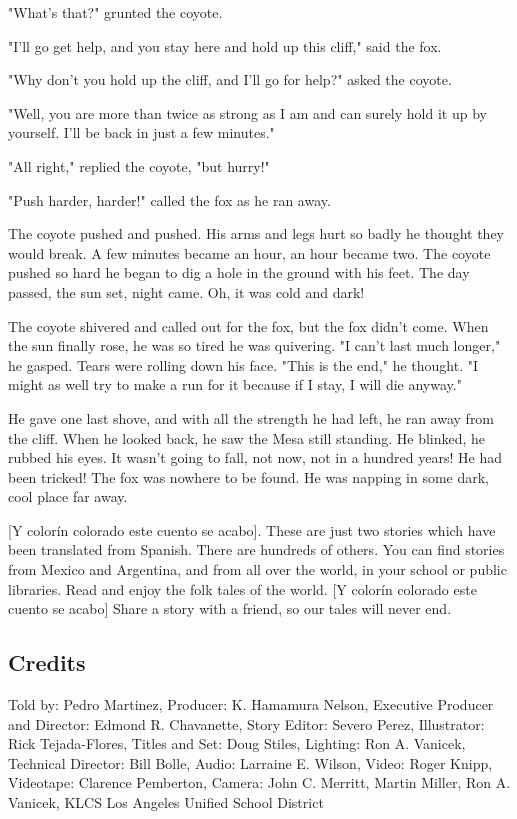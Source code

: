 "What's that?" grunted the coyote.

"I'll go get help, and you stay here and hold up this cliff," said the fox.

"Why don't you hold up the cliff, and I'll go for help?" asked the coyote.

"Well, you are more than twice as strong as I am and can surely hold it up by yourself. I'll be back in just a few minutes."

"All right," replied the coyote, "but hurry!"

"Push harder, harder!" called the fox as he ran away.

The coyote pushed and pushed. His arms and legs hurt so badly he thought they would break. A few minutes became an hour, an hour became two. The coyote pushed so hard he began to dig a hole in the ground with his feet. The day passed, the sun set, night came. Oh, it was cold and dark!

The coyote shivered and called out for the fox, but the fox didn't come. When the sun finally rose, he was so tired he was quivering. "I can't last much longer," he gasped. Tears were rolling down his face. "This is the end," he thought. "I might as well try to make a run for it because if I stay, I will die anyway."

He gave one last shove, and with all the strength he had left, he ran away from the cliff. When he looked back, he saw the Mesa still standing. He blinked, he rubbed his eyes. It wasn't going to fall, not now, not in a hundred years! He had been tricked! The fox was nowhere to be found. He was napping in some dark, cool place far away.

    [Y colorín colorado este cuento se acabo]. These are just two stories which have been translated from Spanish. There are hundreds of others. You can find stories from Mexico and Argentina, and from all over the world, in your school or public libraries. Read and enjoy the folk tales of the world. [Y colorín colorado este cuento se acabo] Share a story with a friend, so our tales will never end.

\subsection{Credits}

Told by: Pedro Martinez,
Producer: K. Hamamura Nelson,
Executive Producer and Director: Edmond R. Chavanette,
Story Editor: Severo Perez,
Illustrator: Rick Tejada-Flores,
Titles and Set: Doug Stiles,
Lighting: Ron A. Vanicek,
Technical Director: Bill Bolle,
Audio: Larraine E. Wilson,
Video: Roger Knipp,
Videotape: Clarence Pemberton,
Camera: John C. Merritt, Martin Miller, Ron A. Vanicek,
KLCS Los Angeles Unified School District

